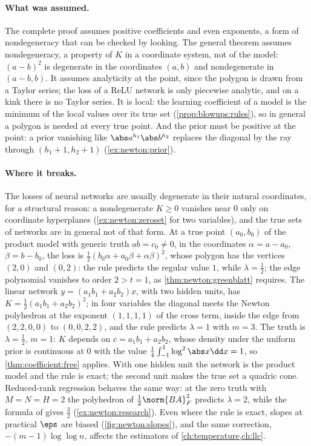 \begin{refsection}
\paragraph{What was assumed.} The complete proof assumes positive coefficients and even exponents, a form of nondegeneracy that can be checked by looking. The general theorem assumes nondegeneracy, a property of $K$ in a coordinate system, not of the model: $(a-b)^2$ is degenerate in the coordinates $(a,b)$ and nondegenerate in $(a-b,b)$. It assumes analyticity at the point, since the polygon is drawn from a Taylor series; the loss of a ReLU network is only piecewise analytic, and on a kink there is no Taylor series. It is local: the learning coefficient of a model is the minimum of the local values over its true set (\cref{prop:blowups:rules}), so in general a polygon is needed at every true point. And the prior must be positive at the point: a prior vanishing like $\abs a^{h_1}\abs b^{h_2}$ replaces the diagonal by the ray through $(h_1+1,h_2+1)$ (\cref{ex:newton:prior}).

\paragraph{Where it breaks.} The losses of neural networks are usually degenerate in their natural coordinates, for a structural reason: a nondegenerate $K\ge0$ vanishes near $0$ only on coordinate hyperplanes (\cref{ex:newton:zeroset} for two variables), and the true sets of networks are in general not of that form. At a true point $(a_0,b_0)$ of the product model with generic truth $ab=c_0\ne0$, in the coordinates $\alpha=a-a_0$, $\beta=b-b_0$, the loss is $\frac12(b_0\alpha+a_0\beta+\alpha\beta)^2$, whose polygon has the vertices $(2,0)$ and $(0,2)$: the rule predicts the regular value $1$, while $\lambda=\frac12$; the edge polynomial vanishes to order $2>t=1$, as \cref{thm:newton:greenblatt} requires. The linear network $y=(a_1b_1+a_2b_2)x$, with two hidden units, has $K=\frac12(a_1b_1+a_2b_2)^2$; in four variables the diagonal meets the Newton polyhedron at the exponent $(1,1,1,1)$ of the cross term, inside the edge from $(2,2,0,0)$ to $(0,0,2,2)$, and the rule predicts $\lambda=1$ with $m=3$. The truth is $\lambda=\frac12$, $m=1$: $K$ depends on $c=a_1b_1+a_2b_2$, whose density under the uniform prior is continuous at $0$ with the value $\frac14\int_{-1}^1\log^2\abs x\dd x=1$, so \cref{thm:coefficient:free} applies. With one hidden unit the network is the product model and the rule is exact; the second unit makes the true set a quadric cone. Reduced-rank regression behaves the same way: at the zero truth with $M=N=H=2$ the polyhedron of $\frac12\norm{BA}_F^2$ predicts $\lambda=2$, while the formula of \textcite{AoyagiWatanabe2005} gives $\frac32$ (\cref{ex:newton:research}). Even where the rule is exact, slopes at practical $\eps$ are biased (\cref{fig:newton:slopes}), and the same correction, $-(m-1)\log\log n$, affects the estimators of \cref{ch:temperature,ch:llc}.


\end{refsection}
